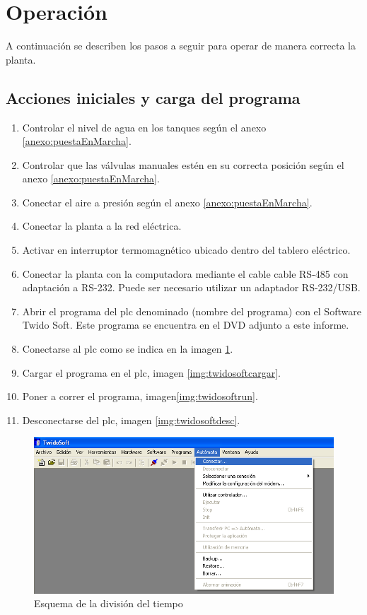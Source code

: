 \section{Operación}
\label{anexo:operacion}

A continuación se describen los pasos a seguir para operar 
de manera correcta la planta.

\subsection{Acciones iniciales y carga del programa}

\begin{enumerate}
 \item Controlar el nivel de agua en los tanques según el anexo \ref{anexo:puestaEnMarcha}.
 \item Controlar que las válvulas manuales estén en su correcta
 posición según el anexo \ref{anexo:puestaEnMarcha}.
 \item Conectar el aire a presión según el anexo \ref{anexo:puestaEnMarcha}.
 \item Conectar la planta a la red eléctrica.
 \item Activar en interruptor termomagnético ubicado dentro del tablero
 eléctrico.
 \item Conectar la planta con la computadora mediante el cable cable RS-485 
 con adaptación a RS-232. Puede ser necesario utilizar un adaptador RS-232/USB.
 \item Abrir el programa del \gls{plc} denominado {\color{red}(nombre del programa)} 
 con el Software Twido Soft. Este programa se encuentra en el DVD adjunto a este 
 informe.
 \item Conectarse al \gls{plc} como se indica en la imagen \ref{img:twidosoft}.
 \item Cargar el programa en el \gls{plc}, imagen \ref{img:twidosoftcargar}.
 \item Poner a correr el programa, imagen\ref{img:twidosoftrun}.
 \item Desconectarse del \gls{plc}, imagen \ref{img:twidosoftdesc}.
\end{enumerate}


\begin{figure}[ht!]
	\centering
	\includegraphics[scale=0.5]{Anexos/images/twidosoft.PNG}
	\caption{Esquema de la división del tiempo}
	\label{img:twidosoft}
\end{figure}

